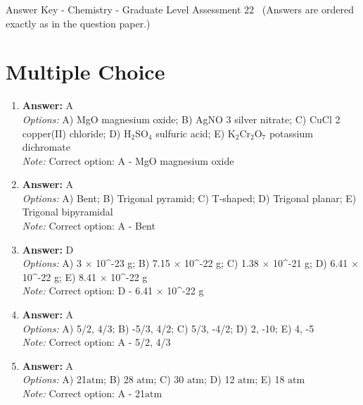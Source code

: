 \documentclass[12pt]{article}
\begin{document}
\begin{center}
Answer Key - Chemistry - Graduate Level Assessment 22 \
\small (Answers are ordered exactly as in the question paper.)
\end{center}

\section*{Multiple Choice}
\begin{enumerate}[label=\arabic*.]
\item \textbf{Answer:} A
\\ \textit{Options:} A) MgO magnesium oxide; B) AgNO 3 silver nitrate; C) CuCl 2 copper(II) chloride; D) H$_{2}$SO$_{4}$ sulfuric acid; E) K$_{2}$Cr$_{2}$O$_{7}$ potassium dichromate
\\ \textit{Note:} Correct option: A - MgO magnesium oxide
\item \textbf{Answer:} A
\\ \textit{Options:} A) Bent; B) Trigonal pyramid; C) T-shaped; D) Trigonal planar; E) Trigonal bipyramidal
\\ \textit{Note:} Correct option: A - Bent
\item \textbf{Answer:} D
\\ \textit{Options:} A) 3 \ensuremath{\times} 10^-23 g; B) 7.15 \ensuremath{\times} 10^-22 g; C) 1.38 \ensuremath{\times} 10^-21 g; D) 6.41 \ensuremath{\times} 10^-22 g; E) 8.41 \ensuremath{\times} 10^-22 g
\\ \textit{Note:} Correct option: D - 6.41 \ensuremath{\times} 10^-22 g
\item \textbf{Answer:} A
\\ \textit{Options:} A) 5/2, 4/3; B) -5/3, 4/2; C) 5/3, -4/2; D) 2, -10; E) 4, -5
\\ \textit{Note:} Correct option: A - 5/2, 4/3
\item \textbf{Answer:} A
\\ \textit{Options:} A) 21$\mathrm{atm}$; B) 28 $\mathrm{atm}$; C) 30 $\mathrm{atm}$; D) 12 $\mathrm{atm}$; E) 18 $\mathrm{atm}$
\\ \textit{Note:} Correct option: A - 21$\mathrm{atm}$
\end{enumerate}
\end{document}
